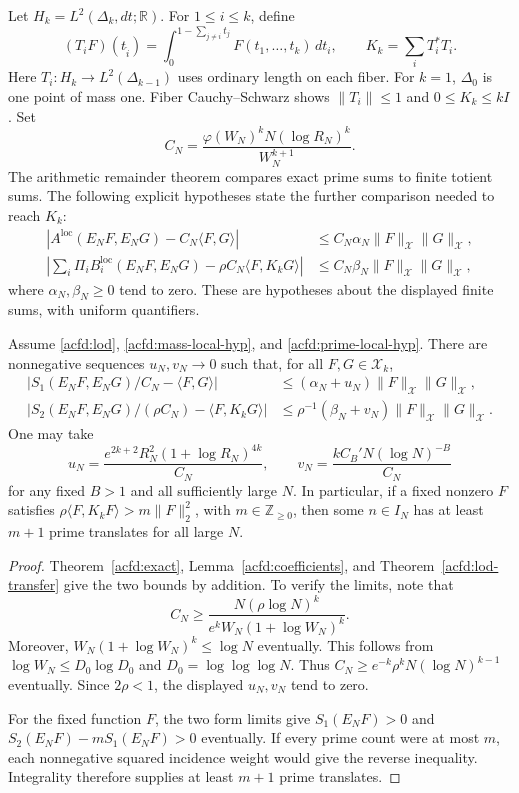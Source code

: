 Let $H_k=L^2(\Delta_k,dt;\mathbb R)$.
For $1\leq i\leq k$, define
\[
 (T_iF)(t_{\widehat i})=
    \int_0^{1-\sum_{j\ne i}t_j}F(t_1,\ldots,t_k)\,dt_i,
 \qquad K_k=\sum_iT_i^*T_i.
\]
Here $T_i:H_k\to L^2(\Delta_{k-1})$ uses ordinary length on each fiber.
For $k=1$, $\Delta_0$ is one point of mass one.
Fiber Cauchy--Schwarz shows $\|T_i\|\leq1$ and $0\leq K_k\leq kI$.
Set
\[
 C_N=\frac{\varphi(W_N)^kN(\log R_N)^k}{W_N^{k+1}}.
\]
The arithmetic remainder theorem compares exact prime sums to finite
totient sums.  The following explicit hypotheses state the further comparison
needed to reach $K_k$:
\begin{align}
 |A^{\mathrm{loc}}(E_NF,E_NG)-C_N\langle F,G\rangle|
     &\leq C_N\alpha_N\|F\|_{\mathcal X}\|G\|_{\mathcal X},
       \label{acfd:mass-local-hyp}\\
 \left|\sum_i\Pi_iB_i^{\mathrm{loc}}(E_NF,E_NG)
                -\rho C_N\langle F,K_kG\rangle\right|
     &\leq C_N\beta_N\|F\|_{\mathcal X}\|G\|_{\mathcal X},
       \label{acfd:prime-local-hyp}
\end{align}
where $\alpha_N,\beta_N\geq0$ tend to zero.
These are hypotheses about the displayed finite sums, with uniform quantifiers.

\begin{proposition}
Assume\label{acfd:composition} \eqref{acfd:lod}, \eqref{acfd:mass-local-hyp}, and
\eqref{acfd:prime-local-hyp}.  There are nonnegative sequences
$u_N,v_N\to0$ such that, for all $F,G\in\mathcal X_k$,
\begin{align*}
 |S_1(E_NF,E_NG)/C_N-\langle F,G\rangle|
     &\leq(\alpha_N+u_N)\|F\|_{\mathcal X}\|G\|_{\mathcal X},\\
 |S_2(E_NF,E_NG)/(\rho C_N)-\langle F,K_kG\rangle|
     &\leq\rho^{-1}(\beta_N+v_N)
                   \|F\|_{\mathcal X}\|G\|_{\mathcal X}.
\end{align*}
One may take
\[
 u_N=\frac{e^{2k+2}R_N^2(1+\log R_N)^{4k}}{C_N},\qquad
 v_N=\frac{kC_B'N(\log N)^{-B}}{C_N}
\]
for any fixed $B>1$ and all sufficiently large $N$.
In particular, if a fixed nonzero $F$ satisfies
$\rho\langle F,K_kF\rangle>m\|F\|_2^2$, with $m\in\mathbb Z_{\geq0}$,
then some $n\in I_N$ has at least $m+1$ prime translates for all large $N$.
\end{proposition}

\begin{proof}
Theorem~\ref{acfd:exact}, Lemma~\ref{acfd:coefficients}, and
Theorem~\ref{acfd:lod-transfer} give the two bounds by addition.
To verify the limits, note that
\[
 C_N\geq
 \frac{N(\rho\log N)^k}{e^kW_N(1+\log W_N)^k}.
\]
Moreover, $W_N(1+\log W_N)^k\leq\log N$ eventually.
This follows from $\log W_N\leq D_0\log D_0$
and $D_0=\log\log\log N$.
Thus $C_N\geq e^{-k}\rho^kN(\log N)^{k-1}$ eventually.
Since $2\rho<1$, the displayed $u_N,v_N$ tend to zero.

For the fixed function $F$, the two form limits give
$S_1(E_NF)>0$ and $S_2(E_NF)-mS_1(E_NF)>0$ eventually.
If every prime count were at most $m$, each nonnegative squared incidence
weight would give the reverse inequality.  Integrality therefore supplies
at least $m+1$ prime translates.
\end{proof}

